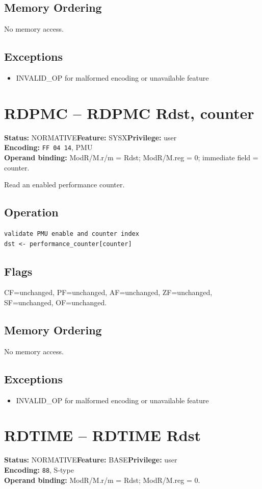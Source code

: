 \documentclass[10pt]{article}
\begin{document}
\subsection*{Memory Ordering}
No memory access.
\subsection*{Exceptions}
\begin{itemize}
\item INVALID\_OP for malformed encoding or unavailable feature
\end{itemize}
\clearpage

\section{RDPMC -- RDPMC Rdst, counter}
\textbf{Status:} NORMATIVE\quad \textbf{Feature:} SYSX\quad \textbf{Privilege:} user\\
\textbf{Encoding:} \texttt{FF 04 14}, PMU\\
\textbf{Operand binding:} ModR/M.r/m = Rdst; ModR/M.reg = 0; immediate field = counter.

Read an enabled performance counter.

\subsection*{Operation}
\begin{lstlisting}
validate PMU enable and counter index
dst <- performance_counter[counter]
\end{lstlisting}
\subsection*{Flags}
CF=unchanged, PF=unchanged, AF=unchanged, ZF=unchanged, SF=unchanged, OF=unchanged.
\subsection*{Memory Ordering}
No memory access.
\subsection*{Exceptions}
\begin{itemize}
\item INVALID\_OP for malformed encoding or unavailable feature
\end{itemize}
\clearpage

\section{RDTIME -- RDTIME Rdst}
\textbf{Status:} NORMATIVE\quad \textbf{Feature:} BASE\quad \textbf{Privilege:} user\\
\textbf{Encoding:} \texttt{88}, S-type\\
\textbf{Operand binding:} ModR/M.r/m = Rdst; ModR/M.reg = 0.
\end{document}
